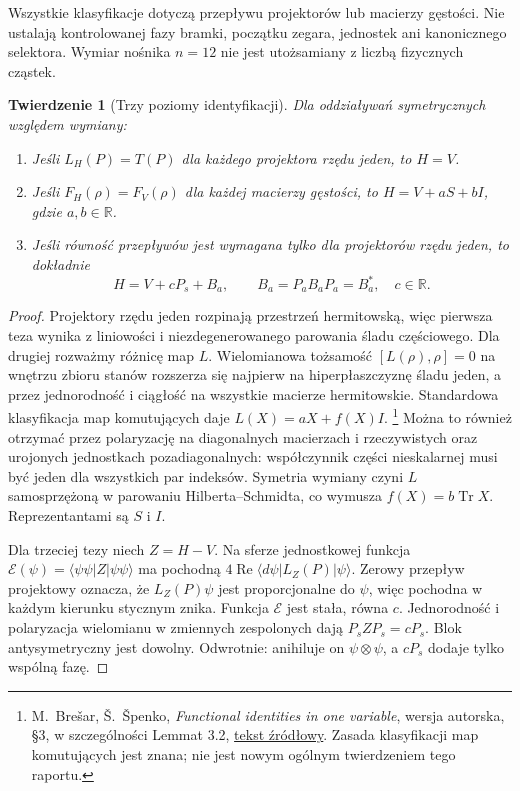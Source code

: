 \documentclass[11pt,a4paper]{article}
\newtheorem{theorem}{Twierdzenie}
\newcommand{\Tr}{\operatorname{Tr}}
\newcommand{\Rea}{\operatorname{Re}}
\begin{document}
Wszystkie klasyfikacje dotyczą przepływu projektorów lub macierzy
gęstości. Nie ustalają kontrolowanej fazy bramki, początku zegara,
jednostek ani kanonicznego selektora. Wymiar nośnika $n=12$ nie jest
utożsamiany z liczbą fizycznych cząstek.

\begin{theorem}[Trzy poziomy identyfikacji]\label{thm:classes}
Dla oddziaływań symetrycznych względem wymiany:
\begin{enumerate}
\item Jeśli $L_H(P)=T(P)$ dla każdego projektora rzędu jeden, to $H=V$.
\item Jeśli $F_H(\rho)=F_V(\rho)$ dla każdej macierzy gęstości, to
$H=V+aS+bI$, gdzie $a,b\in\mathbb R$.
\item Jeśli równość przepływów jest wymagana tylko dla projektorów
rzędu jeden, to dokładnie
\begin{equation}\label{eq:pureclass}
 H=V+cP_s+B_a,\qquad B_a=P_aB_aP_a=B_a^*,\quad c\in\mathbb R.
\end{equation}
\end{enumerate}
\end{theorem}

\begin{proof}
Projektory rzędu jeden rozpinają przestrzeń hermitowską, więc pierwsza
teza wynika z liniowości i niezdegenerowanego parowania śladu częściowego.
Dla drugiej rozważmy różnicę map $L$. Wielomianowa tożsamość
$[L(\rho),\rho]=0$ na wnętrzu zbioru stanów rozszerza się najpierw
na hiperpłaszczyznę śladu jeden, a przez jednorodność i ciągłość na
wszystkie macierze hermitowskie. Standardowa klasyfikacja map komutujących
daje $L(X)=aX+f(X)I$.
\footnote{M.~Brešar, Š.~Špenko, \emph{Functional identities in one variable},
wersja autorska, §3, w szczególności Lemmat 3.2,
\href{https://users.fmf.uni-lj.si/bresar/documents/FIonevar.pdf}{tekst źródłowy}.
Zasada klasyfikacji map komutujących jest znana; nie jest nowym
ogólnym twierdzeniem tego raportu.}
Można to również otrzymać przez polaryzację na diagonalnych macierzach
i rzeczywistych oraz urojonych jednostkach pozadiagonalnych: współczynnik
części nieskalarnej musi być jeden dla wszystkich par indeksów.
Symetria wymiany czyni $L$ samosprzężoną w parowaniu Hilberta--Schmidta,
co wymusza $f(X)=b\Tr X$. Reprezentantami są $S$ i $I$.

Dla trzeciej tezy niech $Z=H-V$. Na sferze jednostkowej funkcja
$\mathcal E(\psi)=\langle\psi\psi|Z|\psi\psi\rangle$ ma pochodną
$4\Rea\langle d\psi|L_Z(P)|\psi\rangle$.
Zerowy przepływ projektowy oznacza, że $L_Z(P)\psi$ jest proporcjonalne
do $\psi$, więc pochodna w każdym kierunku stycznym znika.
Funkcja $\mathcal E$ jest stała, równa $c$. Jednorodność i polaryzacja
wielomianu w zmiennych zespolonych dają $P_s ZP_s=cP_s$.
Blok antysymetryczny jest dowolny. Odwrotnie: anihiluje on
$\psi\otimes\psi$, a $cP_s$ dodaje tylko wspólną fazę.
\end{proof}
\end{document}
